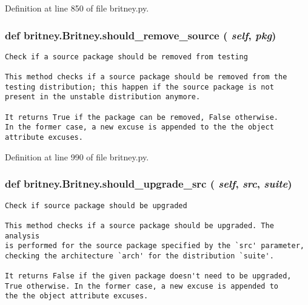 Definition at line 850 of file britney.py.
\subsubsection{\setlength{\rightskip}{0pt plus 5cm}def britney.Britney.should\_\-remove\_\-source ( {\em self},  {\em pkg})}\label{classbritney_1_1Britney_f8a6c9adbdec7a5a982dd2b74febcc08}




\footnotesize\begin{verbatim}Check if a source package should be removed from testing

This method checks if a source package should be removed from the
testing distribution; this happen if the source package is not
present in the unstable distribution anymore.

It returns True if the package can be removed, False otherwise.
In the former case, a new excuse is appended to the the object
attribute excuses.
\end{verbatim}
\normalsize
 

Definition at line 990 of file britney.py.
\subsubsection{\setlength{\rightskip}{0pt plus 5cm}def britney.Britney.should\_\-upgrade\_\-src ( {\em self},  {\em src},  {\em suite})}\label{classbritney_1_1Britney_94785175a85f44b1afaf3add167a211f}




\footnotesize\begin{verbatim}Check if source package should be upgraded

This method checks if a source package should be upgraded. The analysis
is performed for the source package specified by the `src' parameter, 
checking the architecture `arch' for the distribution `suite'.
       
It returns False if the given package doesn't need to be upgraded,
True otherwise. In the former case, a new excuse is appended to
the the object attribute excuses.
\end{verbatim}
\normalsize
 

